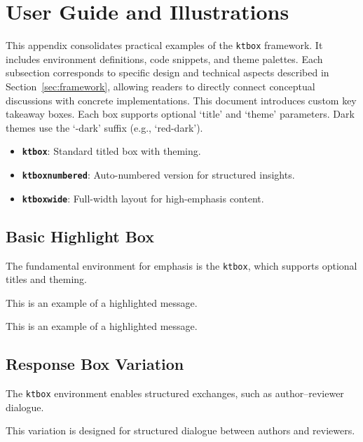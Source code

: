\documentclass[12pt,onecolumn]{article}
\begin{document}
  \clearpage
  \appendix
\section{User Guide and Illustrations}
\label{sec:user-guide}
  This appendix consolidates practical examples of the \texttt{ktbox} framework. It includes environment definitions, code snippets, and theme palettes. Each subsection corresponds to specific design and technical aspects described in Section~\ref{sec:framework}, allowing readers to directly connect conceptual discussions with concrete implementations. This document introduces custom key takeaway boxes. Each box supports optional `title' and `theme' parameters. Dark themes use the `-dark' suffix (e.g., `red-dark').

    \begin{itemize}
      \item \textbf{\texttt{ktbox}}: Standard titled box with theming.
      \item \textbf{\texttt{ktboxnumbered}}: Auto-numbered version for structured insights.
      \item \textbf{\texttt{ktboxwide}}: Full-width layout for high-emphasis content.
    \end{itemize}

  \subsection{Basic Highlight Box}
  \label{sec:basic-box}
    The fundamental environment for emphasis is the \texttt{ktbox}, which supports optional titles and theming.
    \vspace*{0.75em}

    \begin{ktbox}[title={Key Insight}]
      This is an example of a highlighted message.
    \end{ktbox}

    \begin{ktbox}[theme=gray]
      \begin{codeblock}
\vspace*{0.75em}
\begin{ktbox}[title={Key Insight}]
  This is an example of a highlighted message.
\end{ktbox}
      \end{codeblock}
    \end{ktbox}

  \subsection{Response Box Variation}
  \label{sec:response-box}
    The \texttt{ktbox} environment enables structured exchanges, such as author–reviewer dialogue.
    \vspace*{0.75em}
    \begin{ktbox}[title={Reviewer Comment}]
      This variation is designed for structured dialogue between authors and reviewers.
    \end{ktbox}
\end{document}
